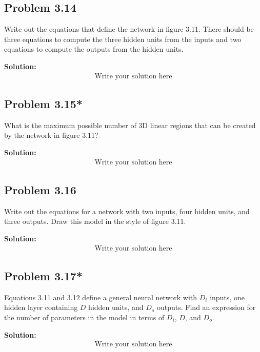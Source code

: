 \documentclass{article}
\begin{document}
    \subsection*{Problem 3.14}
    Write out the equations that define the network in figure 3.11. There should be three equations to compute the three hidden units from the inputs and two equations to compute the outputs from the hidden units.

        \vspace{1cm}
        \textbf{Solution:}
        \begin{align*}
            \text{Write your solution here}
        \end{align*}

    \subsection*{Problem 3.15*}
    What is the maximum possible number of 3D linear regions that can be created by the network in figure 3.11?

        \vspace{1cm}
        \textbf{Solution:}
        \begin{align*}
            \text{Write your solution here}
        \end{align*}

    \subsection*{Problem 3.16}
    Write out the equations for a network with two inputs, four hidden units, and three outputs. Draw this model in the style of figure 3.11.

        \vspace{1cm}
        \textbf{Solution:}
        \begin{align*}
            \text{Write your solution here}
        \end{align*}

    \subsection*{Problem 3.17*}
    Equations 3.11 and 3.12 define a general neural network with $D_i$ inputs, one hidden layer containing $D$ hidden units, and $D_o$ outputs. Find an expression for the number of parameters in the model in terms of $D_i$, $D$, and $D_o$.

        \vspace{1cm}
        \textbf{Solution:}
        \begin{align*}
            \text{Write your solution here}
        \end{align*}
\end{document}
